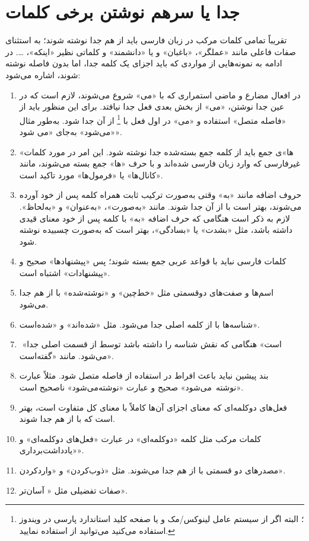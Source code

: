 \section{جدا یا سرهم نوشتن برخی کلمات}
تقریباً تمامی کلمات مرکب در زبان فارسی باید از هم جدا نوشته شوند؛ به استثنای صفات فاعلی مانند «عملگر»، «باغبان» و یا «دانشمند» و کلماتی نظیر «اینکه»، \ldots. 
در ادامه به نمونه‌هایی از مواردی که باید اجزای یک کلمه جدا، اما بدون فاصله نوشته شوند، اشاره می‌شود‌:
\begin{enumerate}
\item
در افعال مضارع و ماضی استمراری که با «می» شروع می‌شوند، لازم است که در عین جدا نوشتن، «می» از بخش بعدی فعل جدا نیافتد‌.‌ برای این منظور باید از «فاصله متصل» استفاده و «می» در اول فعل با %
\footnote{؛ البته اگر از سیستم عامل لینوکس/مک و یا صفحه کلید استاندارد پارسی در ویندوز استفاده می‌کنید 
    می‌توانید از   استفاده نمایید.} 
 از آن جدا شود.‌ به‌طور مثال «می‌شود» به‌جای «می شود». 
\item
	«ها»ی جمع باید از کلمه جمع بسته‌شده جدا نوشته شود. این امر در مورد کلمات غیر‌فارسی که وارد زبان فارسی شده‌اند و با حرف «ها» جمع بسته می‌شوند، مانند «کانال‌ها» یا «فرمول‌ها» مورد تاکید است.
\item
	حروف اضافه مانند «به» وقتی به‌صورت ترکیب ثابت همراه کلمه پس از خود آورده می‌شوند، بهتر است با  از آن جدا شوند‌.‌ مانند «به‌صورت»، «به‌عنوان» و «به‌‌‌لحاظ»‌.‌ لازم به ذکر است هنگامی که حرف اضافه «به» با کلمه پس از خود معنای قیدی داشته باشد، مثل «بشدت» یا «بسادگی»، بهتر است که به‌صورت چسبیده نوشته شود‌.
\item
	کلمات فارسی نباید با قواعد عربی جمع بسته شوند؛ پس «پیشنهادها» صحیح و «پیشنهادات» اشتباه است‌.‌
\item
	اسم‌ها و صفت‌های دو‌قسمتی مثل «خط‌چین» و «نوشته‌شده» با  از هم جدا می‌شود‌.‌
\item
	شناسه‌ها با  از کلمه اصلی جدا می‌شود‌.‌ مثل «شده‌اند»‌ و «شده‌است». 
\item
	‌ «است» هنگامی که نقش شناسه را داشته باشد توسط  از قسمت اصلی جدا می‌شود‌.‌ مانند «گفته‌است»‌.
\item
	بند پیشین نباید باعث افراط در استفاده از فاصله متصل شود. مثلاً عبارت «نوشته~می‌شود‌» صحیح و عبارت «نوشته‌می‌شود» ناصحیح است. 
\item
	فعل‌های دو‌کلمه‌ای که معنای اجزای آن‌ها کاملاً با معنای کل متفاوت است، بهتر است که با  از هم جدا ‌شوند‌.‌
\item
	کلمات مرکب مثل کلمه «دوکلمه‌ای» در عبارت «فعل‌های دوکلمه‌ای» و \linebreak  «یادداشت‌برداری».
\item
	مصدرهای دو قسمتی با  از هم جدا می‌شوند‌.‌ مثل «ذوب‌کردن» و «واردکردن»‌.
\item
	 صفات تفضیلی مثل « آسان‌تر».
\end{enumerate}

